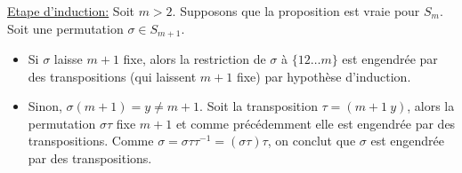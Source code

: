 \documentclass[11pt]{article} %
\begin{document}
\underline{Etape d'induction:} Soit $m>2$. Supposons que la proposition est vraie pour $S_{m}$. Soit une permutation $\sigma \in S_{m+1}$. 
\begin{itemize}
	\item Si $\sigma$ laisse $m+1$ fixe, alors la restriction de $\sigma$ à $\{12\dots m\}$ est engendrée par des transpositions (qui laissent $m+1$ fixe) par hypothèse d'induction. \item Sinon, $\sigma(m+1)=y\neq m+1$. Soit la transposition $\tau=(m+1\ y)$, alors la permutation $\sigma\tau$ fixe $m+1$ et comme précédemment elle est engendrée par des transpositions. Comme $\sigma=\sigma \tau \tau^{-1}=(\sigma \tau) \tau$, on conclut que $\sigma$ est engendrée par des transpositions.
\end{itemize}
\end{document}
